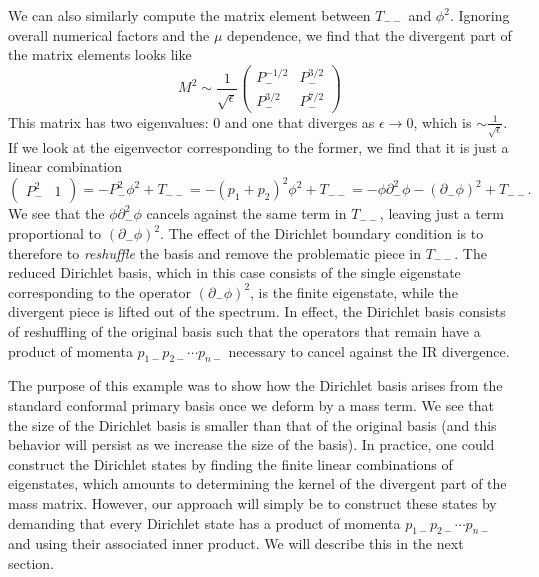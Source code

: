 \begin{subappendices}
We can also similarly compute the matrix element between $T_{--}$ and $\phi^2$. 
Ignoring overall numerical factors and the $\mu$ dependence, we find that the 
divergent part of the matrix elements looks like 
\begin{equation}
    M^2 \sim \frac{1}{\sqrt{\epsilon}} \begin{pmatrix}
        P_-^{-1/2} & P_{-}^{3/2} \\
        P_{-}^{3/2} & P_{-}^{7/2}
    \end{pmatrix}
\end{equation} 
This matrix has two eigenvalues: 0 and one that diverges as $\epsilon \to 0$, 
which is $\sim \frac{1}{\sqrt{\epsilon}}$. If we look at the eigenvector 
corresponding to the former, we find that it is just a linear combination 
\begin{equation}
    \begin{pmatrix}
            P_-^2 & 1
    \end{pmatrix} = -P_-^2 \phi^2 + T_{--} = -(p_1+p_2)^2 \phi^2 + T_{--} = -\phi \partial_-^2 \phi - (\partial_- \phi)^2 + T_{--}.
\end{equation} 
We see that the $\phi \partial_-^2 \phi$ cancels against the same term in 
$T_{--}$, leaving just a term proportional to $(\partial_- \phi)^2$. The effect 
of the Dirichlet boundary condition is to therefore to \textit{reshuffle} the 
basis and remove the problematic piece in $T_{--}$. The reduced Dirichlet basis, 
which in this case consists of the single eigenstate corresponding to the 
operator $(\partial_- \phi)^2$, is the finite eigenstate, while the divergent 
piece is lifted out of the spectrum. In effect, the Dirichlet basis consists of 
reshuffling of the original basis such that the operators that remain have a 
product of momenta $p_{1-} p_{2-} \dotsb p_{n-}$ necessary to cancel against the 
IR divergence.

The purpose of this example was to show how the Dirichlet basis arises from the 
standard conformal primary basis once we deform by a mass term. We see that the 
size of the Dirichlet basis is smaller than that of the original basis (and this 
behavior will persist as we increase the size of the basis). In practice, one 
could construct the Dirichlet states by finding the finite linear combinations 
of eigenstates, which amounts to determining the kernel of the divergent part of 
the mass matrix. However, our approach will simply be to construct these states 
by demanding that every Dirichlet state has a product of momenta 
$p_{1-} p_{2-} \dotsb p_{n-}$ and using their associated inner product. We will 
describe this in the next section.


\end{subappendices}
